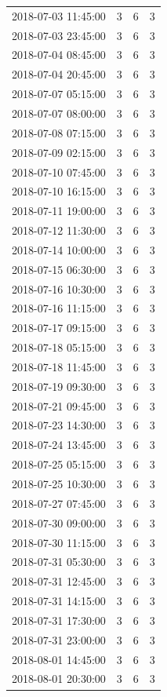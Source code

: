 \begin{tabular}{lrrr}
2018-07-03 11:45:00 & 3 & 6 & 3 \\
2018-07-03 23:45:00 & 3 & 6 & 3 \\
2018-07-04 08:45:00 & 3 & 6 & 3 \\
2018-07-04 20:45:00 & 3 & 6 & 3 \\
2018-07-07 05:15:00 & 3 & 6 & 3 \\
2018-07-07 08:00:00 & 3 & 6 & 3 \\
2018-07-08 07:15:00 & 3 & 6 & 3 \\
2018-07-09 02:15:00 & 3 & 6 & 3 \\
2018-07-10 07:45:00 & 3 & 6 & 3 \\
2018-07-10 16:15:00 & 3 & 6 & 3 \\
2018-07-11 19:00:00 & 3 & 6 & 3 \\
2018-07-12 11:30:00 & 3 & 6 & 3 \\
2018-07-14 10:00:00 & 3 & 6 & 3 \\
2018-07-15 06:30:00 & 3 & 6 & 3 \\
2018-07-16 10:30:00 & 3 & 6 & 3 \\
2018-07-16 11:15:00 & 3 & 6 & 3 \\
2018-07-17 09:15:00 & 3 & 6 & 3 \\
2018-07-18 05:15:00 & 3 & 6 & 3 \\
2018-07-18 11:45:00 & 3 & 6 & 3 \\
2018-07-19 09:30:00 & 3 & 6 & 3 \\
2018-07-21 09:45:00 & 3 & 6 & 3 \\
2018-07-23 14:30:00 & 3 & 6 & 3 \\
2018-07-24 13:45:00 & 3 & 6 & 3 \\
2018-07-25 05:15:00 & 3 & 6 & 3 \\
2018-07-25 10:30:00 & 3 & 6 & 3 \\
2018-07-27 07:45:00 & 3 & 6 & 3 \\
2018-07-30 09:00:00 & 3 & 6 & 3 \\
2018-07-30 11:15:00 & 3 & 6 & 3 \\
2018-07-31 05:30:00 & 3 & 6 & 3 \\
2018-07-31 12:45:00 & 3 & 6 & 3 \\
2018-07-31 14:15:00 & 3 & 6 & 3 \\
2018-07-31 17:30:00 & 3 & 6 & 3 \\
2018-07-31 23:00:00 & 3 & 6 & 3 \\
2018-08-01 14:45:00 & 3 & 6 & 3 \\
2018-08-01 20:30:00 & 3 & 6 & 3 \\

\end{tabular}
